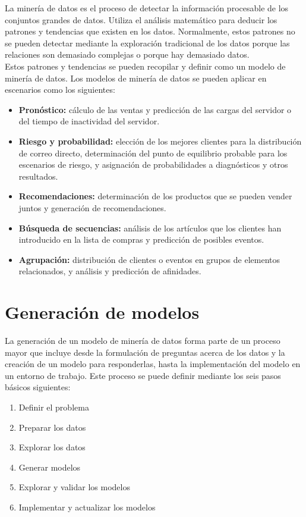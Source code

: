\documentclass[a4paper, 11pt]{article} %
\begin{document}
La minería de datos es el proceso de detectar la información procesable de los conjuntos grandes de datos. Utiliza el análisis matemático para deducir los patrones y tendencias que existen en los datos. Normalmente, estos patrones no se pueden detectar mediante la exploración tradicional de los datos porque las relaciones son demasiado complejas o porque hay demasiado datos.\\

Estos patrones y tendencias se pueden recopilar y definir como un modelo de minería de datos. Los modelos de minería de datos se pueden aplicar en escenarios como los siguientes:

\begin{itemize}
\item \textbf{Pronóstico:} cálculo de las ventas y predicción de las cargas del servidor o del tiempo de inactividad del servidor.
\item \textbf{Riesgo y probabilidad:} elección de los mejores clientes para la distribución de correo directo, determinación del punto de equilibrio probable para los escenarios de riesgo, y asignación de probabilidades a diagnósticos y otros resultados.
\item \textbf{Recomendaciones:} determinación de los productos que se pueden vender juntos y generación de recomendaciones.
\item \textbf{Búsqueda de secuencias:} análisis de los artículos que los clientes han introducido en la lista de compras y predicción de posibles eventos.
\item \textbf{Agrupación:} distribución de clientes o eventos en grupos de elementos relacionados, y análisis y predicción de afinidades.
\end{itemize}

\section*{Generación de modelos}

La generación de un modelo de minería de datos forma parte de un proceso mayor que incluye desde la formulación de preguntas acerca de los datos y la creación de un modelo para responderlas, hasta la implementación del modelo en un entorno de trabajo. Este proceso se puede definir mediante los seis pasos básicos siguientes:

\begin{enumerate}
\item Definir el problema
\item Preparar los datos
\item Explorar los datos
\item Generar modelos
\item Explorar y validar los modelos
\item Implementar y actualizar los modelos
\end{enumerate}
\end{document}
